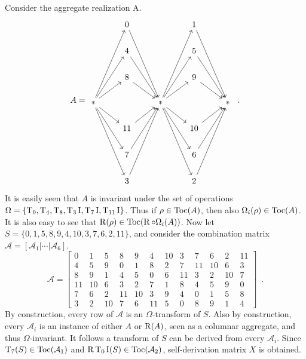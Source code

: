 \begin{example}
    \label{ex:stingray}
    Consider the aggregate realization A.
    \begin{equation}
        A = \begin{tikzcd}
            & 0 \arrow[dddr] && 1 \arrow[dddr] & \\
            & 4 \arrow[ddr] && 5 \arrow[ddr] & \\
            & 8 \arrow[dr] && 9 \arrow[dr] & \\
            * \arrow[ur] \arrow[uur] \arrow[uuur] \arrow[dr] \arrow[ddr] \arrow[dddr] && * \arrow[ur] \arrow[uur] \arrow[uuur] \arrow[dr] \arrow[ddr] \arrow[dddr] && * \\
            & 11 \arrow[ur] && 10 \arrow[ur] & \\
            & 7 \arrow[uur] && 6 \arrow[uur] & \\
            & 3 \arrow[uuur] && 2 \arrow[uuur] &
        \end{tikzcd} \enspace.
    \end{equation}
    It is easily seen that $A$ is invariant under the set of operations $\Omega = \{ \operatorname{T}_0, \operatorname{T}_4, \operatorname{T}_8, \operatorname{T}_3\operatorname{I}, \operatorname{T}_7\operatorname{I}, \operatorname{T}_{11}\operatorname{I} \}$. Thus if $\rho \in \operatorname{Toc}(A)$, then also $\Omega_i(\rho) \in \operatorname{Toc}(A)$. It is also easy to see that $\operatorname{R}(\rho) \in \operatorname{Toc}(\operatorname{R} \circ \Omega_i(A))$. Now let $S = \{ 0, 1, 5, 8, 9, 4, 10, 3, 7, 6, 2, 11 \}$, and consider the combination matrix $\mathcal{A} = [\mathcal{A}_1 | \cdots | \mathcal{A}_6]$.
    \begin{equation}
        \mathcal{A} = \left[
        \begin{array}{cc|cc|cc|cc|cc|cc}
            0 & 1 & 5 & 8 & 9 & 4 & 10 & 3 & 7 & 6 & 2 & 11 \\
            4 & 5 & 9 & 0 & 1 & 8 & 2 & 7 & 11 & 10 & 6 & 3 \\
            8 & 9 & 1 & 4 & 5 & 0 & 6 & 11 & 3 & 2 & 10 & 7 \\
            11 & 10 & 6 & 3 & 2 & 7 & 1 & 8 & 4 & 5 & 9 & 0 \\
            7 & 6 & 2 & 11 & 10 & 3 & 9 & 4 & 0 & 1 & 5 & 8 \\
            3 & 2 & 10 & 7 & 6 & 11 & 5 & 0 & 8 & 9 & 1 & 4
        \end{array}
        \right] \enspace.
    \end{equation}
    By construction, every row of $\mathcal{A}$ is an $\Omega$-transform of $S$. Also by construction, every $\mathcal{A}_i$ is an instance of either $A$ or $\operatorname{R}(A)$, seen as a columnar aggregate, and thus $\Omega$-invariant. It follows a transform of $S$ can be derived from every $\mathcal{A}_i$. Since $\operatorname{T}_7(S) \in \operatorname{Toc}(\mathcal{A}_1)$ and $\operatorname{R}\operatorname{T}_0\operatorname{I}(S) \in \operatorname{Toc}(\mathcal{A}_2)$, self-derivation matrix $X$ is obtained.

\end{example}
